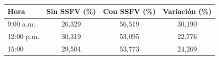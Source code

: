 \begin{tabular}{lccc}
\toprule
\textbf{Hora} & \textbf{Sin SSFV (\%)} & \textbf{Con SSFV (\%)} & \textbf{Variación (\%)} \\
\midrule
9:00 a.m. & 26,329 & 56,519 & 30,190 \\
12:00 p.m. & 30,319 & 53,095 & 22,776 \\
15:00 & 29,504 & 53,773 & 24,269 \\
\bottomrule
\end{tabular}
